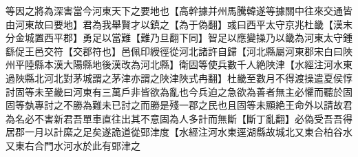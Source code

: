 等因之將為深害當今河東天下之要地也【高幹據并州馬騰韓遂等據關中往來交通皆由河東故曰要地】君為我舉賢才以鎮之【為于偽翻】彧曰西平太守京兆杜畿【漢末分金城置西平郡】勇足以當難【難乃旦翻下同】智足以應變操乃以畿為河東太守鍾繇促王邑交符【交郡符也】邑佩印綬徑從河北諸許自歸【河北縣屬河東郡宋白曰陜州平陸縣本漢大陽縣地後漢改為河北縣】衛固等使兵數千人絶陜津【水經注河水東過陜縣北河北對茅城謂之茅津亦謂之陜津陜式冉翻】杜畿至數月不得渡操遣夏侯惇討固等未至畿曰河東有三萬戶非皆欲為亂也今兵迫之急欲為善者無主必懼而聽於固固等埶專討之不勝為難未已討之而勝是殘一郡之民也且固等未顯絶王命外以請故君為名必不害新君吾單車直往出其不意固為人多計而無斷【斷丁亂翻】必偽受吾吾得居郡一月以計縻之足矣遂詭道從郖津度【水經注河水東逕湖縣故城北又東合柏谷水又東右合門水河水於此有郖津之